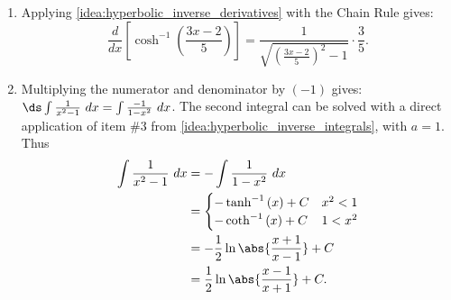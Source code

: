 {\begin{enumerate}
\item	Applying \autoref{idea:hyperbolic_inverse_derivatives} with the Chain Rule gives:
		\[\frac{d}{dx}\left[\cosh^{-1}\left(\frac{3x-2}5\right)\right] = \frac{1}{\sqrt{\left(\frac{3x-2}5\right)^2-1}}\cdot\frac35.\]

\item		Multiplying the numerator and denominator by $(-1)$ gives: $\ds \int \frac{1}{x^2-1}\ dx = \int \frac{-1}{1-x^2}\ dx$. The second integral can be solved with a direct application of item \#3 from \autoref{idea:hyperbolic_inverse_integrals}, with $a=1$. Thus
\begin{align}
\int \frac{1}{x^2-1}\ dx &= -\int \frac{1}{1-x^2}\ dx \notag \\
		&= \begin{cases}-\tanh^{-1}\left(x\right)+C & x^2<1 \\
-\coth^{-1}\left(x\right)+C & 1<x^2 \end{cases} \notag\\
     &=-\frac12\ln\abs{\frac{x+1}{x-1}}+C\notag\\
     &=\frac12\ln\abs{\frac{x-1}{x+1}}+C.\label{eq:hf3}
     \end{align}


%


\end{enumerate}}
